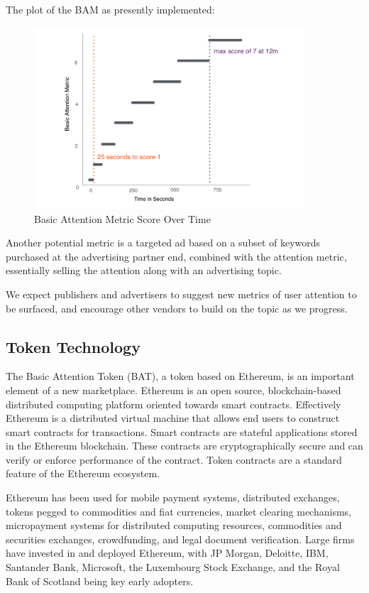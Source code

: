 \documentclass[11pt]{article}
\begin{document}
The plot of the BAM as presently implemented:


\begin{figure}
\begin{center}
\includegraphics[width=0.9\textwidth]{BAM_score_over_time.png}
\caption{Basic Attention Metric Score Over Time}
\end{center}
\end{figure}


Another potential metric is a targeted ad based on a subset of keywords purchased at the advertising partner end, combined with the attention metric, essentially selling the attention along with an advertising topic. 

We expect publishers and advertisers to suggest new metrics of user attention to be surfaced, and encourage other vendors to build on the topic as we progress.
\subsection{Token Technology}
\label{sec-4-2}

The Basic Attention Token (BAT), a token based on Ethereum, is an important element of a new marketplace. Ethereum is an open source, blockchain-based distributed computing platform oriented towards smart contracts. Effectively Ethereum is a distributed virtual machine that allows end users to construct smart contracts for transactions. Smart contracts are stateful applications stored in the Ethereum blockchain. These contracts are cryptographically secure and can verify or enforce performance of the contract. Token contracts are a standard feature of the Ethereum ecosystem.

Ethereum has been used for mobile payment systems, distributed exchanges, tokens pegged to commodities and fiat currencies, market clearing mechanisms, micropayment systems for distributed computing resources, commodities and securities exchanges, crowdfunding, and legal document verification. Large firms have invested in and deployed Ethereum, with JP Morgan, Deloitte, IBM, Santander Bank, Microsoft, the Luxembourg Stock Exchange, and the Royal Bank of Scotland being key early adopters.
\end{document}
